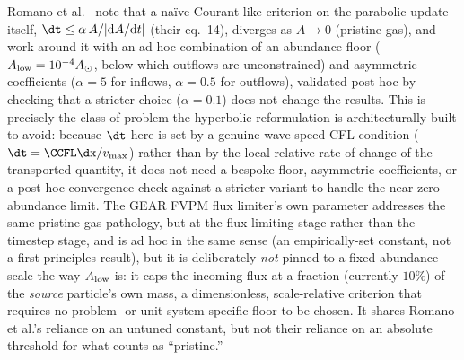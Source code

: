 \begin{remark}
Romano et al.~\citeyear{Romano2022} note that a na\"ive Courant-like criterion
on the parabolic update itself, $\dt\leq\alpha\,A/\lvert{\rm d}A/{\rm
d}t\rvert$ (their eq.~14), diverges as $A\to0$ (pristine gas), and work
around it with an ad hoc combination of an abundance floor
($A_{\rm low}=10^{-4}A_\odot$, below which outflows are unconstrained) and
asymmetric coefficients ($\alpha=5$ for inflows, $\alpha=0.5$ for
outflows), validated post-hoc by checking that a stricter choice
($\alpha=0.1$) does not change the results. This is precisely the class of
problem the hyperbolic reformulation is architecturally built to avoid:
because $\dt$ here is set by a genuine wave-speed CFL condition
($\dt=\CCFL\dx/v_{\max}$) rather than by the local relative rate of change
of the transported quantity, it does not need a bespoke floor, asymmetric
coefficients, or a post-hoc convergence check against a stricter variant
to handle the near-zero-abundance limit. The GEAR FVPM flux limiter's own
 parameter addresses the same pristine-gas
pathology, but at the flux-limiting stage rather than the timestep stage,
and is ad hoc in the same sense (an empirically-set constant, not a
first-principles result), but it is deliberately \emph{not} pinned to a
fixed abundance scale the way $A_{\rm low}$ is: it caps the incoming flux
at a fraction (currently $10\%$) of the \emph{source} particle's own mass,
a dimensionless, scale-relative criterion that requires no problem- or
unit-system-specific floor to be chosen. It shares Romano et al.'s
reliance on an untuned constant, but not their reliance on an absolute
threshold for what counts as ``pristine.''
\end{remark}

